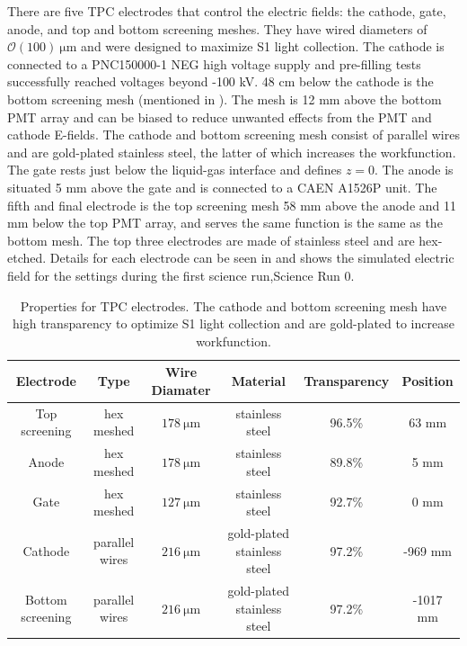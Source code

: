 There are five TPC electrodes that control the electric fields: the cathode, gate, anode, and top and bottom screening meshes.  They have
wired diameters of $\mathcal{O}(100)\ \mathrm{\mu m}$ and were designed to maximize S1 light collection.  The cathode is connected to a
PNC150000-1 NEG high voltage supply and pre-filling tests successfully reached voltages beyond -100 kV.  48
cm below the cathode is the bottom screening mesh (mentioned in ).  The mesh is 12 mm above the bottom PMT
array and can be biased to reduce unwanted effects from the PMT and cathode E-fields.  The cathode and bottom screening mesh consist of
parallel wires and are gold-plated stainless steel, the latter of which increases the workfunction.  The gate rests just below the
liquid-gas interface and defines $z = 0$.  The anode is
situated 5 mm above the gate and is connected to a CAEN A1526P unit.  The fifth and final electrode is the top screening mesh 58 mm above
the anode and 11 mm below the top PMT array, and serves the same function is the same as the bottom mesh.  The top three electrodes are
made of stainless steel and are hex-etched.  Details for each electrode can be seen in  and
 shows the simulated electric field for the settings during the first science run,Science Run 0.

\begin{table}
\centering
\begin{tabular}{cccccc}
\hline
Electrode & Type & Wire Diamater & Material & Transparency & Position \\
\hline
Top screening & hex meshed & $178\ \mathrm{\mu m}$ & stainless steel & 96.5\% & 63 mm \\
Anode & hex meshed & $178\ \mathrm{\mu m}$ & stainless steel & 89.8\% & 5 mm \\
Gate & hex meshed & $127\ \mathrm{\mu m}$ & stainless steel & 92.7\% & 0 mm \\
Cathode & parallel wires & $216\ \mathrm{\mu m}$ & gold-plated stainless steel & 97.2\% & -969 mm \\
Bottom screening & parallel wires & $216\ \mathrm{\mu m}$ & gold-plated stainless steel & 97.2\% & -1017 mm \\
\hline
\end{tabular}
\caption{Properties for TPC electrodes.  The cathode and bottom screening mesh have high transparency to optimize S1 light collection and
are gold-plated to increase workfunction.}
\label{tab:xenon1t_tpc_electrodes}
\end{table}

